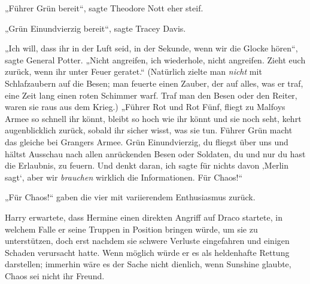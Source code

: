 „Führer Grün bereit“, sagte Theodore Nott eher steif.

„Grün Einundvierzig bereit“, sagte Tracey Davis.

„Ich will, dass ihr in der Luft seid, in der Sekunde, wenn wir die Glocke hören“, sagte General Potter. „Nicht angreifen, ich wiederhole, nicht angreifen. Zieht euch zurück, wenn ihr unter Feuer geratet.“ (Natürlich zielte man \emph{nicht} mit Schlafzaubern auf die Besen; man feuerte einen Zauber, der auf alles, was er traf, eine Zeit lang einen roten Schimmer warf. Traf man den Besen oder den Reiter, waren sie raus aus dem Krieg.) „Führer Rot und Rot Fünf, fliegt zu Malfoys Armee so schnell ihr könnt, bleibt so hoch wie ihr könnt und sie noch seht, kehrt augenblicklich zurück, sobald ihr sicher wisst, was sie tun. Führer Grün macht das gleiche bei Grangers Armee. Grün Einundvierzig, du fliegst über uns und hältst Ausschau nach allen anrückenden Besen oder Soldaten, du und nur du hast die Erlaubnis, zu feuern. Und denkt daran, ich sagte für nichts davon ‚Merlin sagt‘, aber wir \emph{brauchen} wirklich die Informationen. Für Chaos!“

„Für Chaos!“ gaben die vier mit variierendem Enthusiasmus zurück.

Harry erwartete, dass Hermine einen direkten Angriff auf Draco startete, in welchem Falle er seine Truppen in Position bringen würde, um sie zu unterstützen, doch erst nachdem sie schwere Verluste eingefahren und einigen Schaden verursacht hatte. Wenn möglich würde er es als heldenhafte Rettung darstellen; immerhin wäre es der Sache nicht dienlich, wenn Sunshine glaubte, Chaos sei nicht ihr Freund.


